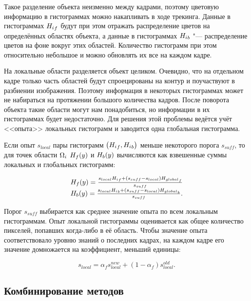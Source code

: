 Такое разделение объекта неизменно между кадрами, поэтому цветовую информацию
в гистограммах можно накапливать в ходе трекинга.
Данные в гистограммах ${H_i}_f$ будут при этом отражать распределение
цветов на определённых областях объекта, а данные в гистограммах ${H_i}_b$
"--- распределение цветов на фоне вокруг этих областей.
Количество гистограмм при этом относительно небольшое и можно 
обновлять их все на каждом кадре.

На локальные области разделяется объект целиком. 
Очевидно, что на отдельном кадре только часть областей будут спроецированы на
контур и поучаствуют в разбиении изображения.
Поэтому информация в некоторых гистограммах может не набираться на протяжении
большого количества кадров.
После поворота объекта такие области могут нам понадобиться, но информации в
их гистограммах будет недостаточно.
Для решения этой проблемы ведётся учёт <<опыта>> локальных гистограмм и
заводится одна глобальная гистограмма.

Если опыт $s_{local}$ пары гистограмм $\left( {H_i}_f, {H_i}_b \right)$
меньше некоторого порога
$s_{suff}$, то для точек области $\Omega_i$ $H_f(y)$ и $H_b(y)$ вычисляются
как
взвешенные суммы локальных и глобальных гистограмм:

\begin{equation}
\label{eqn:histo_skill}
\begin{array}{c}
H_f(y) = \frac{s_{local} {H_i}_f + (s_{suff} - s_{local})
{H_{global}}_f}{s_{suff}} \\
H_b(y) = \frac{s_{local} {H_i}_b + (s_{suff} - s_{local})
{H_{global}}_b}{s_{suff}}
\text{.}
\end{array}
\end{equation}

Порог $s_{suff}$ выбирается как среднее значение опыта по всем локальным
гистограммам.
Опыт локальной гистограммы оценивается как общее количество пикселей, попавших
когда-либо в её область.
Чтобы значение опыта соответствовало уровню знаний о последних кадрах, на
каждом кадре его значение домножается на коэффициент, меньший единицы:

\begin{equation}
s_{local} =  \alpha_f s_{local}^{new} + (1 - \alpha_f)  s_{local}^{old} 
\text{.}
\end{equation}


\subsection{Комбинирование методов}

